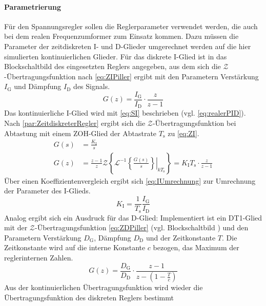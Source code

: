 \paragraph{Parametrierung} Für den Spannungsregler sollen die Reglerparameter verwendet werden, die auch bei dem realen Frequenzumformer zum Einsatz kommen. Dazu müssen die Parameter der zeitdiskreten I- und D-Glieder umgerechnet werden auf die hier simulierten kontinuierlichen Glieder. Für das diskrete I-Glied ist in \cite{pillerpowersystemsPILLERUniversityRegelungstechnik} das Blockschaltbild des eingesetzten Reglers angegeben, aus dem sich die $\mathcal{Z}$-Übertragungsfunktion nach \cref{eq:ZIPiller} ergibt mit den Parametern Verstärkung $I_\mathrm{G}$ und Dämpfung $I_\mathrm{D}$ des Signals.
\begin{equation}
	\label{eq:ZIPiller}
	G(z) = \frac{I_\mathrm{G}}{I_\mathrm{D}}\cdot\frac{z}{z-1}
\end{equation}
Das kontinuierliche I-Glied wird mit \cref{eq:SI} beschrieben (vgl. \cref{eq:realerPID}). Nach \cref{par:ZeitdiskreterRegler} ergibt sich die $\mathcal{Z}$-Übertragungsfunktion bei Abtastung mit einem ZOH-Glied der Abtastrate $T_\mathrm{s}$ zu \cref{eq:ZI}.
\begin{align}
	G(s) &= \frac{K_\mathrm{I}}{s} \label{eq:SI}\\
	G(z) &= \frac{z-1}{z} \mathcal{Z}\left\{ \mathcal{L}^{-1}\left.\left\{\frac{G(s)}{s}\right\}\right|_{kT_{\mathrm{s}}} \right\} = K_\mathrm{I}T_\mathrm{s}\cdot\frac{z}{z-1} \label{eq:ZI}
\end{align}
Über einen Koeffizientenvergleich ergibt sich \cref{eq:IUmrechnung} zur Umrechnung der Parameter des I-Glieds.
\begin{equation}
	K_\mathrm{I} = \frac{1}{T_\mathrm{s}}\frac{I_\mathrm{G}}{I_\mathrm{D}}\label{eq:IUmrechnung}
\end{equation}
Analog ergibt sich ein Ausdruck für das D-Glied: Implementiert ist ein DT1-Glied mit der $\mathcal{Z}$-Übertragungsfunktion \cref{eq:ZDPiller} (vgl. Blockschaltbild \cite{pillerpowersystemsPILLERUniversityRegelungstechnik}) und den Parametern Verstärkung $D_\mathrm{G}$, Dämpfung $D_\mathrm{D}$ und der Zeitkonstante $T$. Die Zeitkonstante wird auf die interne Konstante $c$ bezogen, das Maximum der reglerinternen Zahlen.
\begin{equation}
	G(z) = \frac{D_\mathrm{G}}{D_\mathrm{D}}\cdot\frac{z-1}{z-(1-\frac{T}{c})}\label{eq:ZDPiller}
\end{equation}
Aus der kontinuierlichen Übertragungsfunktion wird wieder die Übertragungsfunktion des diskreten Reglers bestimmt 
